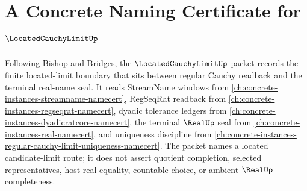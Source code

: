 \chapter{A Concrete Naming Certificate for $\LocatedCauchyLimitUp$}
\label{ch:concrete-instances-located-cauchy-limit-namecert}

Following Bishop and Bridges, the $\LocatedCauchyLimitUp$ packet records the finite located-limit boundary that sits between regular Cauchy readback and the terminal real-name seal. It reads StreamName windows from \autoref{ch:concrete-instances-streamname-namecert}, RegSeqRat readback from \autoref{ch:concrete-instances-regseqrat-namecert}, dyadic tolerance ledgers from \autoref{ch:concrete-instances-dyadicratcore-namecert}, the terminal $\RealUp$ seal from \autoref{ch:concrete-instances-real-namecert}, and uniqueness discipline from \autoref{ch:concrete-instances-regular-cauchy-limit-uniqueness-namecert}. The packet names a located candidate-limit route; it does not assert quotient completion, selected representatives, host real equality, countable choice, or ambient $\RealUp$ completeness.

